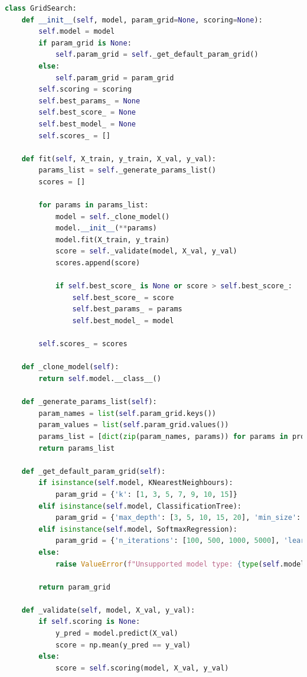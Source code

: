 \documentclass[letterpaper,10pt]{article}
\begin{document}
\begin{lstlisting}[language=Python, caption=optimisers.py - GridSearch]
    class GridSearch:
    def __init__(self, model, param_grid=None, scoring=None):
        self.model = model
        if param_grid is None:
            self.param_grid = self._get_default_param_grid()
        else:
            self.param_grid = param_grid
        self.scoring = scoring
        self.best_params_ = None
        self.best_score_ = None
        self.best_model_ = None
        self.scores_ = []

    def fit(self, X_train, y_train, X_val, y_val):
        params_list = self._generate_params_list()
        scores = []

        for params in params_list:
            model = self._clone_model()
            model.__init__(**params)
            model.fit(X_train, y_train)
            score = self._validate(model, X_val, y_val)
            scores.append(score)

            if self.best_score_ is None or score > self.best_score_:
                self.best_score_ = score
                self.best_params_ = params
                self.best_model_ = model

        self.scores_ = scores

    def _clone_model(self):
        return self.model.__class__()

    def _generate_params_list(self):
        param_names = list(self.param_grid.keys())
        param_values = list(self.param_grid.values())
        params_list = [dict(zip(param_names, params)) for params in product(*param_values)]
        return params_list
    
    def _get_default_param_grid(self):
        if isinstance(self.model, KNearestNeighbours):
            param_grid = {'k': [1, 3, 5, 7, 9, 10, 15]}
        elif isinstance(self.model, ClassificationTree):
            param_grid = {'max_depth': [3, 5, 10, 15, 20], 'min_size': [2, 5, 10, 20]}
        elif isinstance(self.model, SoftmaxRegression):
            param_grid = {'n_iterations': [100, 500, 1000, 5000], 'learning_rate': [0.001, 0.01, 0.1, 1]}
        else:
            raise ValueError(f"Unsupported model type: {type(self.model)}")

        return param_grid

    def _validate(self, model, X_val, y_val):
        if self.scoring is None:
            y_pred = model.predict(X_val)
            score = np.mean(y_pred == y_val)
        else:
            score = self.scoring(model, X_val, y_val)


\end{lstlisting}
\end{document}
